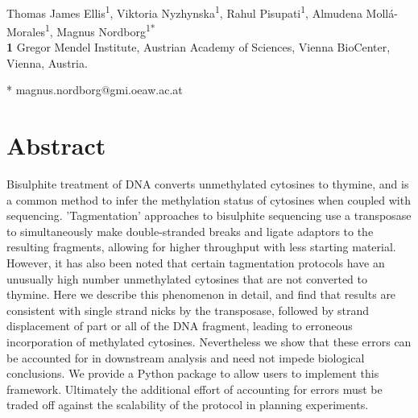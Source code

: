 \documentclass[10pt,letterpaper]{article}
\begin{document}
\vspace*{0.2in}

\begin{flushleft}
{\Large
\textbf{} %
}
\newline
\\
Thomas James Ellis\textsuperscript{1},
Viktoria Nyzhynska\textsuperscript{1},
Rahul Pisupati\textsuperscript{1},
Almudena Moll\'a-Morales\textsuperscript{1},
Magnus Nordborg\textsuperscript{1*}
\\
\bigskip
\textbf{1} Gregor Mendel Institute, Austrian Academy of Sciences, Vienna BioCenter, Vienna, Austria.
\\
\bigskip

* magnus.nordborg@gmi.oeaw.ac.at

\end{flushleft}
\section*{Abstract}
Bisulphite treatment of DNA converts unmethylated cytosines to thymine, and is a common method to infer the methylation status of cytosines when coupled with sequencing.
'Tagmentation' approaches to bisulphite sequencing use a transposase to simultaneously make double-stranded breaks and ligate adaptors to the resulting fragments, allowing for higher throughput with less starting material.
However, it has also been noted that certain tagmentation protocols have an unusually high number unmethylated cytosines that are not converted to thymine.
Here we describe this phenomenon in detail, and find that results are consistent with single strand nicks by the transposase, followed by strand displacement of part or all of the DNA fragment, leading to erroneous incorporation of methylated cytosines.
Nevertheless we show that these errors can be accounted for in downstream analysis and need not impede biological conclusions.
We provide a Python package to allow users to implement this framework.
Ultimately the additional effort of accounting for errors must be traded off against the scalability of the protocol in planning experiments.
\end{document}
